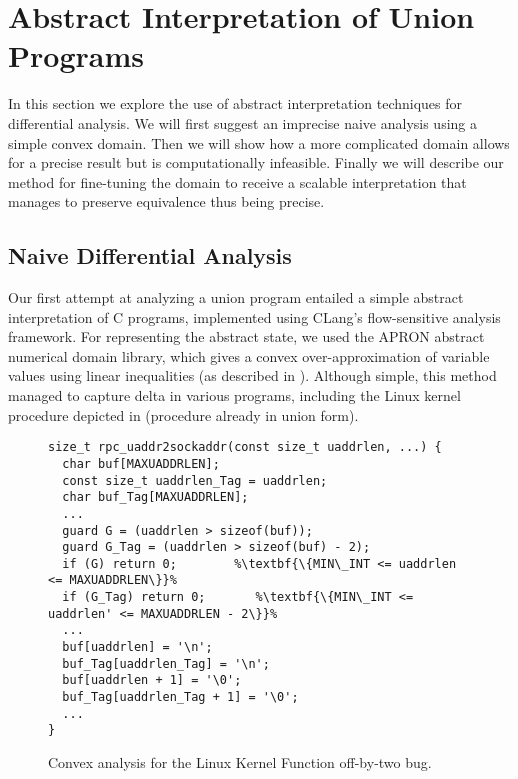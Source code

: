 \section{Abstract Interpretation of Union Programs} \label{Se:Interpretation}
In this section we explore the use of abstract interpretation techniques for differential analysis. We will first suggest an imprecise naive analysis using a simple convex domain. Then we will show how a more complicated domain allows for a precise result but is computationally infeasible. Finally we will describe our method for fine-tuning the domain to receive a scalable interpretation that manages to preserve equivalence thus being precise.

\subsection{Naive Differential Analysis}\label{Se:Naive}
Our first attempt at analyzing a union program entailed a simple abstract interpretation of C programs, implemented using CLang's flow-sensitive analysis framework. For representing the abstract state, we used the APRON abstract numerical domain library, which gives a convex over-approximation of variable values using linear inequalities (as described in ). Although simple, this method managed to capture delta in various programs, including the Linux kernel  procedure depicted in  (procedure already in union form).

\begin{figure}[ht]\label{Fi:LinuxOBT}
\begin{lstlisting}
size_t rpc_uaddr2sockaddr(const size_t uaddrlen, ...) {
  char buf[MAXUADDRLEN];
  const size_t uaddrlen_Tag = uaddrlen;
  char buf_Tag[MAXUADDRLEN];
  ...
  guard G = (uaddrlen > sizeof(buf));
  guard G_Tag = (uaddrlen > sizeof(buf) - 2);
  if (G) return 0;        %\textbf{\{MIN\_INT <= uaddrlen <= MAXUADDRLEN\}}%
  if (G_Tag) return 0;       %\textbf{\{MIN\_INT <= uaddrlen' <= MAXUADDRLEN - 2\}}%
  ...
  buf[uaddrlen] = '\n';
  buf_Tag[uaddrlen_Tag] = '\n';
  buf[uaddrlen + 1] = '\0';
  buf_Tag[uaddrlen_Tag + 1] = '\0';
  ...
}
\end{lstlisting}\caption{Convex analysis for the Linux Kernel Function  off-by-two bug.}
\end{figure}


